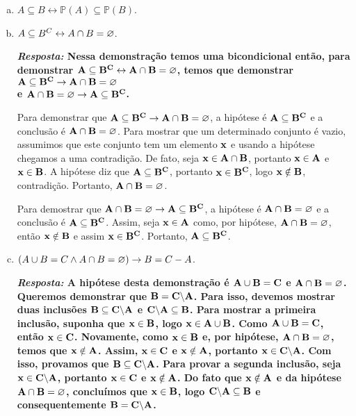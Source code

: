 \begin{enumerate}[{\bf 1.}]
\begin{enumerate}[a)]
{\bf{\it Resposta:} Primeiro mostremos que ${\bf A\subseteq B\to A\uni B=B}$. Seja ${\bf x\in B}$. Ent\ao ${\bf x\in A}$ ou ${\bf x\in B}$ assim ${\bf x\in A\uni B}$. Agora, seja ${\bf x\in A\uni B}$. Portanto, ${\bf x\in A}$ ou ${\bf x\in B}$. Se ${\bf x\in B}$ o teorema estar\'a pronto, portanto, suponha ${\bf x\in A}$. Como ${\bf A\subseteq B}$ temos ${\bf x\in B}$ e assim ${\bf A\uni B=B}$. Agora, mostremos que ${\bf A\uni B=B\to A\subseteq B}$. Seja ${\bf x\in A}$. Ent\ao ${\bf x\in A\uni B}$ e, portanto, ${\bf x\in B}$ pois ${\bf A\uni B=B}$.}

\item $A\subseteq B\leftrightarrow \mathbb{P}(A)\subseteq\mathbb{P}(B)$.
\item $A\subseteq B^C\leftrightarrow A\cap B=\varnothing$.

{\bf{\it Resposta:} Nessa demonstração temos uma bicondicional então, para demonstrar ${\bf A\subseteq B^C\leftrightarrow A\cap B=\varnothing}$, temos que demonstrar ${\bf A\subseteq B^C\to A\cap B=\varnothing}$ \\ e ${\bf A\cap B=\varnothing\to A\subseteq B^C}$.

Para demonstrar que ${\bf A\subseteq B^C\to A\cap B=\varnothing}$, a hipótese é ${\bf A\subseteq B^C}$ e a conclusão é ${\bf A\cap B=\varnothing}$. Para mostrar que um determinado conjunto é vazio, assumimos que este conjunto tem um elemento ${\bf x}$ e usando a hipótese chegamos a uma contradição. De fato, seja ${\bf x\in A\cap B}$, portanto ${\bf x\in A}$ e ${\bf x\in B}$. A hipótese diz que ${\bf A\subseteq B^C}$, portanto ${\bf x\in B^C}$, logo ${\bf x\notin B}$, contradição. Portanto, ${\bf A\cap B=\varnothing}$.

Para demostrar que ${\bf A\cap B=\varnothing\to A\subseteq B^C}$, a hipótese é ${\bf A\cap B=\varnothing}$ e a conclusão é ${\bf A\subseteq B^C}$. Assim, seja ${\bf x\in A}$ como, por hipótese, ${\bf A\cap B=\varnothing}$, então ${\bf x\notin B}$ e assim ${\bf x\in B^C}$. Portanto, ${\bf A\subseteq B^C}$. }

\item $(A\cup B=C\wedge A\cap B=\varnothing)\to B=C-A$.

{\bf{\it Resposta:} A hipótese desta demonstração é ${\bf A\cup B=C}$ e ${\bf A\cap B=\varnothing}$. Queremos demonstrar que ${\bf B=C\backslash A}$. Para isso, devemos mostrar duas inclusões ${\bf B\subseteq C\backslash A}$ e ${\bf C \backslash A\subseteq B}$. Para mostrar a primeira inclusão, suponha que ${\bf x\in B}$, logo ${\bf x\in A\uni B}$. Como ${\bf A\cup B=C}$, então ${\bf x\in C}$. Novamente, como ${\bf x\in B}$ e, por hipótese, ${\bf A\cap B=\varnothing}$, temos que ${\bf x\notin A}$. Assim, ${\bf x\in C}$ e ${\bf x\notin A}$, portanto ${\bf x\in C\backslash A}$. Com isso, provamos que ${\bf B\subseteq C\backslash A}$. Para provar a segunda inclusão, seja ${\bf x\in C\backslash A}$, portanto ${\bf x\in C}$ e ${\bf x\notin A}$. Do fato que ${\bf x\notin A}$ e da hipótese ${\bf A\cap B=\varnothing}$, concluímos que ${\bf x\in B}$, logo ${\bf C \backslash A\subseteq B}$ e consequentemente ${\bf B=C \backslash A}$.}


\end{enumerate}
\end{enumerate}
